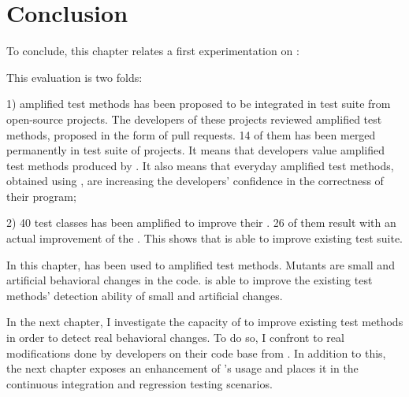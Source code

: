 \section{Conclusion}
\label{sec:test-improvement:conclusion}

To conclude, this chapter relates a first experimentation on \dspot:

This evaluation is two folds:

1) amplified test methods has been proposed to be integrated in test suite from open-source projects. 
The developers of these projects reviewed amplified test methods, proposed in the form of pull requests.
14 of them has been merged permanently in test suite of projects.
It means that developers value amplified test methods produced by \dspot.
It also means that everyday amplified test methods, obtained using \dspot, are increasing the developers' confidence in the correctness of their program;

2) 40 test classes has been amplified to improve their \ms.
26 of them result with an actual improvement of the \ms.
This shows that \dspot is able to improve existing test suite.

In this chapter, \ms has been used to amplified test methods.
Mutants are small and artificial behavioral changes in the code.
\dspot is able to improve the existing test methods' detection ability of small and artificial changes.

In the next chapter, I investigate the capacity of \dspot to improve existing test methods in order to detect real behavioral changes.
To do so, I confront \dspot to real modifications done by developers on their code base from \gh.
In addition to this, the next chapter exposes an enhancement of \dspot's usage and places it in the continuous integration and regression testing scenarios.